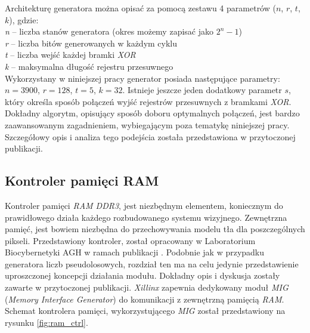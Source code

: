 Architekturę generatora można opisać za pomocą zestawu 4 parametrów ($n$, $r$, $t$, $k$), gdzie:\\
\-\hspace{1cm} \textit{n} -- liczba stanów generatora (okres możemy zapisać jako $2^n-1$)\\
\-\hspace{1cm} \textit{r} -- liczba bitów generowanych w każdym cyklu\\
\-\hspace{1cm} \textit{t} -- liczba wejść każdej bramki \textit{XOR}\\
\-\hspace{1cm} \textit{k} -- maksymalna długość rejestru przesuwnego\\

Wykorzystany w niniejszej pracy generator posiada następujące parametry: $n=3900$, $r=128$, $t=5$, $k=32$. Istnieje jeszcze jeden dodatkowy parametr $s$, który określa sposób połączeń wyjść rejestrów przesuwnych z bramkami \textit{XOR}. Dokładny algorytm, opisujący sposób doboru optymalnych połączeń, jest bardzo zaawansowanym zagadnieniem, wybiegającym poza tematykę niniejszej pracy. Szczegółowy opis i analiza tego podejścia została przedstawiona w przytoczonej publikacji.

\subsection{Kontroler pamięci RAM}
\label{subsec:fpga_ram_kontroler}

Kontroler pamięci \textit{RAM DDR3}, jest niezbędnym elementem, koniecznym do prawidłowego działa każdego rozbudowanego systemu wizyjnego. Zewnętrzna pamięć, jest bowiem niezbędna do przechowywania modelu tła dla poszczególnych pikseli. Przedstawiony kontroler, został opracowany w Laboratorium Biocybernetyki AGH w ramach publikacji \cite{kryjak_14_hd_fpga}. Podobnie jak w przypadku generatora liczb pseudolosowych, rozdział ten ma na celu jedynie przedstawienie uproszczonej koncepcji działania modułu. Dokładny opis i dyskusja zostały zawarte w przytoczonej publikacji. \textit{Xillinx} zapewnia dedykowany moduł \textit{MIG} (\textit{Memory Interface Generator}) do komunikacji z zewnętrzną pamięcią \textit{RAM}. Schemat kontrolera pamięci, wykorzystującego \textit{MIG} został przedstawiony na rysunku \ref{fig:ram_ctrl}. 

